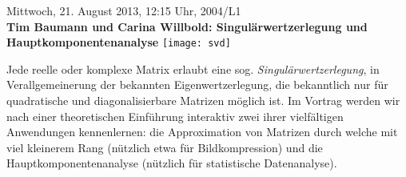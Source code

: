 \documentclass[a4paper,ngerman,landscape]{scrartcl}
\begin{document}
\begin{center}
  \Huge
  Mittwoch, 21. August 2013, 12:15 Uhr, 2004/L1 \\
  \textbf{Tim Baumann und Carina Willbold: Singulärwertzerlegung und
  Hauptkomponentenanalyse}
  \vfill
  \texttt{[image: svd]}
  \vfill

  \Large
  \begin{minipage}{0.91\textwidth}
    \setlength\parskip{\medskipamount}
    Jede reelle oder komplexe Matrix erlaubt eine sog.
    \emph{Singulärwertzerlegung}, in Verallgemeinerung der bekannten
    Eigenwertzerlegung, die bekanntlich nur für quadratische und
    diagonalisierbare Matrizen möglich ist. Im Vortrag werden wir nach einer
    theoretischen Einführung interaktiv zwei ihrer vielfältigen Anwendungen
    kennenlernen: die Approximation von Matrizen durch welche mit viel
    kleinerem Rang (nützlich etwa für Bildkompression) und die
    Hauptkomponentenanalyse (nützlich für statistische Datenanalyse).
  \end{minipage}
\end{center}
\end{document}
